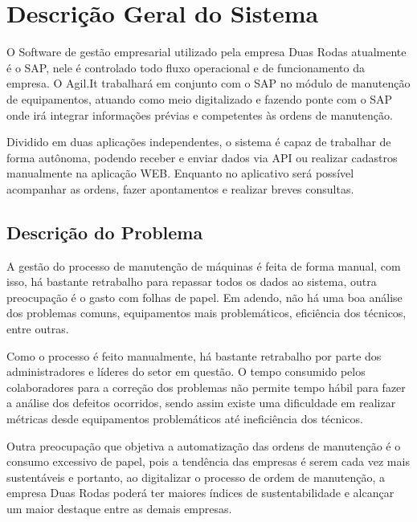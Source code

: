 \chapter{Descrição Geral do Sistema}

O Software de gestão empresarial utilizado pela empresa Duas Rodas atualmente é o SAP, nele é controlado todo fluxo operacional e de funcionamento da empresa. O Agil.It trabalhará em conjunto com o SAP no módulo de manutenção de equipamentos, atuando como meio digitalizado e fazendo ponte com o SAP onde irá integrar informações prévias e competentes às ordens de manutenção.

Dividido em duas aplicações independentes, o sistema é capaz de trabalhar de forma autônoma, podendo receber e enviar dados via API ou realizar cadastros manualmente na aplicação WEB. Enquanto no aplicativo será possível acompanhar as ordens, fazer apontamentos e realizar breves consultas.

\section{Descrição do Problema}
A gestão do processo de manutenção de máquinas é feita de forma manual, com isso, há bastante retrabalho para repassar todos os dados ao sistema, outra preocupação é o gasto com folhas de papel. Em adendo, não há uma boa análise dos problemas comuns, equipamentos mais problemáticos, eficiência dos técnicos, entre outras.

Como o processo é feito manualmente, há bastante retrabalho por parte dos administradores e líderes do setor em questão. O tempo consumido pelos colaboradores para a correção dos problemas não permite tempo hábil para fazer a análise dos defeitos ocorridos, sendo assim existe uma dificuldade em realizar métricas desde equipamentos problemáticos até ineficiência dos técnicos.

Outra preocupação que objetiva a automatização das ordens de manutenção é o consumo excessivo de papel, pois a tendência das empresas é serem cada vez mais sustentáveis e portanto, ao digitalizar o processo de ordem de manutenção, a empresa Duas Rodas poderá  ter maiores índices de sustentabilidade e alcançar um maior destaque entre as demais empresas.

